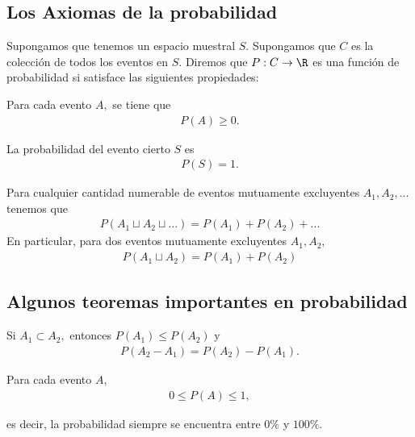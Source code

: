 \subsection{Los Axiomas de la probabilidad}
{}
Supongamos que tenemos un espacio muestral $S.$ Supongamos que $C$ es la colección de todos los eventos en $S.$ Diremos que $P:C \to \R$ es una función de probabilidad si satisface las siguientes propiedades:



\begin{axiom}
   Para cada evento $A,$ se tiene que
   \begin{align}
   \label{1.1}
    P(A)\geq 0.
   \end{align}

\end{axiom}



\begin{axiom}
   La probabilidad del evento cierto $S$ es
   \begin{align}
   \label{1.2}
    P(S)=1.
   \end{align}
\end{axiom}



\begin{axiom}
  Para cualquier cantidad numerable de eventos mutuamente excluyentes
  $A_{1},A_{2},...$ tenemos que
  \begin{align}
   \label{1.3}
   P(A_{1}\sqcup A_{2} \sqcup ...)=P(A_{1})+P(A_{2})+...
  \end{align}
En particular, para dos eventos mutuamente excluyentes $A_{1},A_{2},$
\begin{align}
	\label{1.4}
 P(A_{1}\sqcup A_{2})=P(A_{1})+P(A_{2})
\end{align}

\end{axiom}


\subsection{Algunos teoremas importantes en probabilidad}
{}
	\begin{thm}
	 \label{thm:1.1}
	 Si $A_{1}\subset A_{2},$ entonces $P(A_{1})\leq P(A_{2})$ y
	 \begin{align*}
		P(A_{2}-A_{1})=P(A_{2})-P(A_{1}).
\end{align*}
	\end{thm}


{}
\begin{thm}
 \label{thm:1.2}
 Para cada evento $A$,
 \begin{align}
  \label{1.5}
  0\leq P(A) \leq 1,
 \end{align}

es decir, la probabilidad siempre se encuentra entre $0\%$ y $100\%.$
\end{thm}


